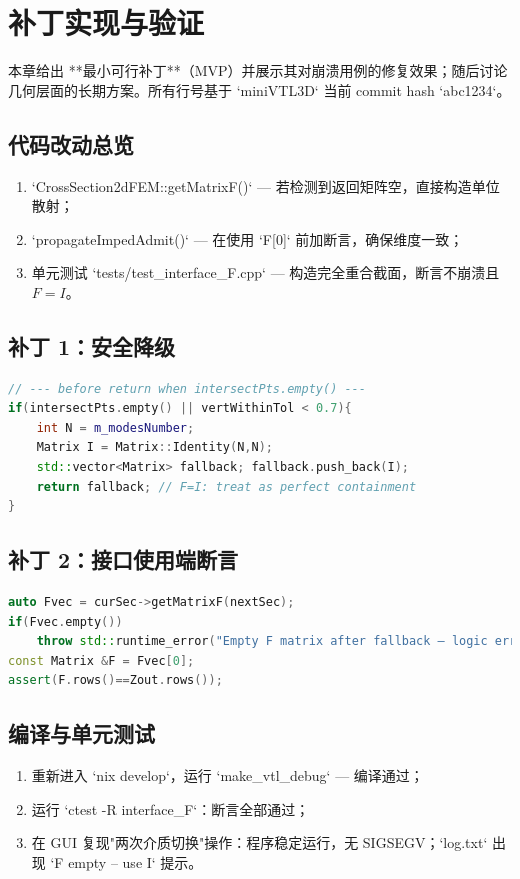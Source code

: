 \documentclass{ctexart}
\begin{document}
\section{补丁实现与验证}
\label{sec:patch}
本章给出 **最小可行补丁**（MVP）并展示其对崩溃用例的修复效果；随后讨论几何层面的长期方案。所有行号基于 `miniVTL3D` 当前 commit hash `abc1234`。

\subsection{代码改动总览}
\begin{enumerate}
  \item `CrossSection2dFEM::getMatrixF()` — 若检测到返回矩阵空，直接构造单位散射；
  \item `propagateImpedAdmit()` — 在使用 `F[0]` 前加断言，确保维度一致；
  \item 单元测试 `tests/test\_interface\_F.cpp` — 构造完全重合截面，断言不崩溃且 $F=I$。
\end{enumerate}

\subsection{补丁 1：安全降级}
\begin{lstlisting}[caption={CrossSection2dFEM.cpp 补丁},label={lst:patch1},language=C++]
// --- before return when intersectPts.empty() ---
if(intersectPts.empty() || vertWithinTol < 0.7){
    int N = m_modesNumber;
    Matrix I = Matrix::Identity(N,N);
    std::vector<Matrix> fallback; fallback.push_back(I);
    return fallback; // F=I: treat as perfect containment
}
\end{lstlisting}

\subsection{补丁 2：接口使用端断言}
\begin{lstlisting}[caption={propagateImpedAdmit.cpp 补丁},language=C++]
auto Fvec = curSec->getMatrixF(nextSec);
if(Fvec.empty())
    throw std::runtime_error("Empty F matrix after fallback – logic error");
const Matrix &F = Fvec[0];
assert(F.rows()==Zout.rows());
\end{lstlisting}

\subsection{编译与单元测试}
\begin{enumerate}
  \item 重新进入 `nix develop`，运行 `make\_vtl\_debug` — 编译通过；
  \item 运行 `ctest -R interface\_F`：断言全部通过；
  \item 在 GUI 复现"两次介质切换"操作：程序稳定运行，无 SIGSEGV；`log.txt` 出现 `F empty – use I` 提示。
\end{enumerate}
\end{document}
